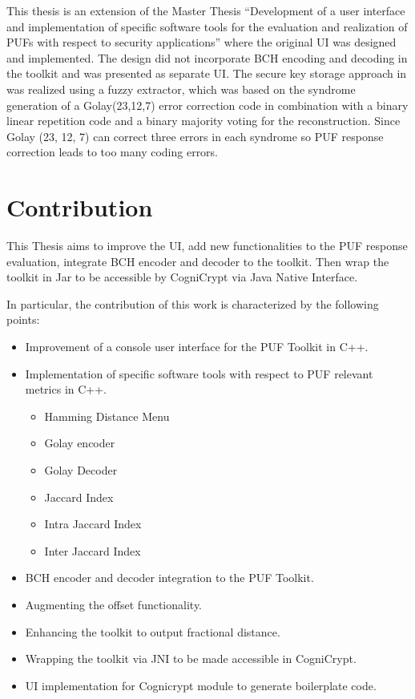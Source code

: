 This thesis is an extension of the Master Thesis ``Development of a user interface and implementation of specific software tools for the evaluation and realization of PUFs with respect to security applications''\cite{71} where the original UI was designed and implemented. The design did not incorporate BCH encoding and decoding in the toolkit and was presented as separate UI. The secure key storage approach in \cite{10} was realized using a fuzzy extractor, which was based on the syndrome
generation of a Golay(23,12,7) error correction code in combination with a binary linear repetition code and a binary majority voting for the reconstruction\cite{71}. Since Golay (23, 12, 7) can correct three errors in each syndrome so PUF response correction leads to too many coding errors.

\section{Contribution}
This Thesis aims to improve the UI, add new functionalities to the PUF response evaluation, integrate BCH encoder and decoder to the toolkit.
Then wrap the toolkit in Jar to be accessible by CogniCrypt via Java Native Interface.

In particular, the contribution of this work is characterized by the following points:

\begin{itemize}
	\item Improvement of a console user interface for the PUF Toolkit in C++.
	\item Implementation of specific software tools with respect to PUF relevant metrics in C++.
		\begin{itemize}
			\item Hamming Distance Menu
			\item Golay encoder 
			\item Golay Decoder
			\item Jaccard Index 
			\item Intra Jaccard Index
			\item Inter Jaccard Index
		\end{itemize}
	\item BCH encoder and decoder integration to the PUF Toolkit.
	\item Augmenting the offset functionality.
	\item Enhancing the toolkit to output fractional distance.
	\item Wrapping the toolkit via JNI to be made accessible in CogniCrypt.
	\item UI implementation for Cognicrypt module to generate boilerplate code.
\end{itemize}

